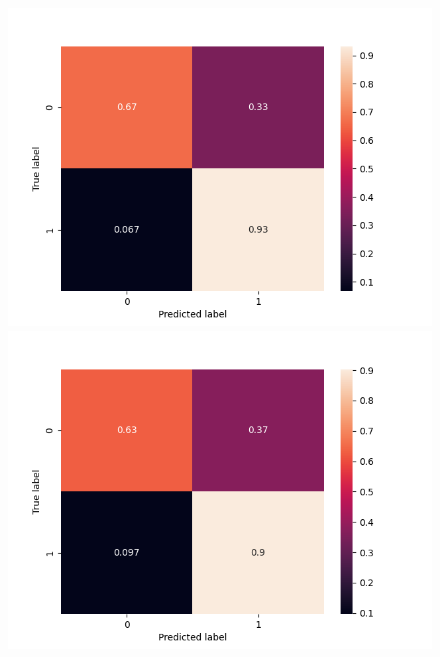\begin{figure}[b!]
    \includegraphics[width=\linewidth]{figures/results/word_embeddings/lgr/take_image/lgr_set_3_confusion_matrix_percent.png}
    \endminipage
    \includegraphics[width=\linewidth]{figures/results/word_embeddings/lgr/take_image/lgr_set_4_confusion_matrix_percent.png}
    \endminipage


\end{figure}
